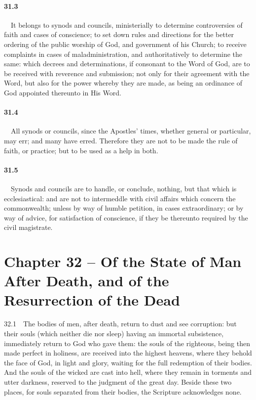 \paragraph{31.3}\ \ It belongs to synods and councils, ministerially to determine controversies of faith and cases of conscience; to set down rules and directions for the better ordering of the public worship of God, and government of his Church; to receive complaints in cases of maladministration, and authoritatively to determine the same: which decrees and determinations, if consonant to the Word of God, are to be received with reverence and submission; not only for their agreement with the Word, but also for the power whereby they are made, as being an ordinance of God appointed thereunto in His Word.   
\bigskip
\paragraph{31.4}\ \ All synods or councils, since the Apostles{}' times, whether general or particular, may err; and many have erred. Therefore they are not to be made the rule of faith, or practice; but to be used as a help in both.   
\bigskip
\paragraph{31.5}\ \ Synods and councils are to handle, or conclude, nothing, but that which is ecclesiastical: and are not to intermeddle with civil affairs which concern the commonwealth; unless by way of humble petition, in cases extraordinary; or by way of advice, for satisfaction of conscience, if they be thereunto required by the civil magistrate.  

\section{Chapter 32 -- Of the State of Man After Death, and of the Resurrection of the Dead} 32.1\ \ The bodies of men, after death, return to dust and see corruption: but their souls (which neither die nor sleep) having an immortal subsistence, immediately return to God who gave them: the souls of the righteous, being then made perfect in holiness, are received into the highest heavens, where they behold the face of God, in light and glory, waiting for the full redemption of their bodies. And the souls of the wicked are cast into hell, where they remain in torments and utter darkness, reserved to the judgment of the great day. Beside these two places, for souls separated from their bodies, the Scripture acknowledges none.   
\bigskip
